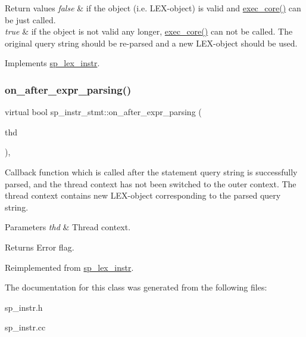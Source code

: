 \begin{DoxyRetVals}{Return values}
{\em false} & if the object (i.\+e. L\+EX-\/object) is valid and \mbox{\hyperlink{classsp__instr__stmt_a10255fd8768c13b35a715b78aac47b3f}{exec\+\_\+core()}} can be just called.\\
\hline
{\em true} & if the object is not valid any longer, \mbox{\hyperlink{classsp__instr__stmt_a10255fd8768c13b35a715b78aac47b3f}{exec\+\_\+core()}} can not be called. The original query string should be re-\/parsed and a new L\+EX-\/object should be used. \\
\hline
\end{DoxyRetVals}


Implements \mbox{\hyperlink{classsp__lex__instr_a56788cb475ccf94f224816006d9c90e9}{sp\+\_\+lex\+\_\+instr}}.

\mbox{\label{classsp__instr__stmt_a2918355010fb4072cd4eba8628fe931e}} 
\subsubsection{\texorpdfstring{on\+\_\+after\+\_\+expr\+\_\+parsing()}{on\_after\_expr\_parsing()}}
{\footnotesize\ttfamily virtual bool sp\+\_\+instr\+\_\+stmt\+::on\+\_\+after\+\_\+expr\+\_\+parsing (\begin{DoxyParamCaption}\item[{T\+HD $\ast$}]{thd }\end{DoxyParamCaption})\hspace{0.3cm}{\ttfamily [inline]}, {\ttfamily [virtual]}}

Callback function which is called after the statement query string is successfully parsed, and the thread context has not been switched to the outer context. The thread context contains new L\+EX-\/object corresponding to the parsed query string.


\begin{DoxyParams}{Parameters}
{\em thd} & Thread context.\\
\hline
\end{DoxyParams}
\begin{DoxyReturn}{Returns}
Error flag. 
\end{DoxyReturn}


Reimplemented from \mbox{\hyperlink{classsp__lex__instr_adcace7d5b7daeb393d0592592a2d9d6c}{sp\+\_\+lex\+\_\+instr}}.



The documentation for this class was generated from the following files\+:\begin{DoxyCompactItemize}
\item 
sp\+\_\+instr.\+h\item 
sp\+\_\+instr.\+cc\end{DoxyCompactItemize}
